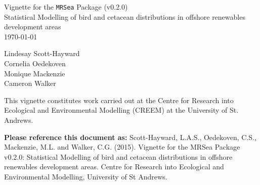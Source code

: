 \documentclass[10pt, a4paper]{article}\usepackage[]{graphicx}\usepackage[]{color}
\begin{document}
\begin{titlepage}


\begin{center}
\vspace* {0.70 in}

\noindent\makebox[\linewidth]{\rule{\paperwidth}{0.4pt}}

\huge{Vignette for the {\tt MRSea} Package (v0.2.0)}\\[0.5 cm]
\Large{Statistical Modelling of bird and cetacean distributions in offshore renewables development areas}\\
\vspace{0.3 in}
\today

\noindent\makebox[\linewidth]{\rule{\paperwidth}{0.4pt}}


\vspace{1 in}
\Large{Lindesay Scott-Hayward}\\
\Large{Cornelia Oedekoven}\\
\Large{Monique Mackenzie}\\
\Large{Cameron Walker}\\[0.5 cm]


\vspace{1.6 in}
\begin{center}
\large{This vignette constitutes work carried out at the Centre for Research into Ecological and Environmental Modelling (CREEM) at the University of St. Andrews.}
\end{center}


\thispagestyle{empty}

\end{center}

\end{titlepage}

\vspace{0.3cm}
\textbf{Please reference this document as:}
\noindent Scott-Hayward, L.A.S., Oedekoven, C.S., Mackenzie, M.L. and Walker, C.G. (2015). Vignette for the MRSea Package v0.2.0: Statistical Modelling of bird and cetacean distributions in offshore renewables development areas. Centre for Research into Ecological and Environmental Modelling, University of St Andrews.



%


\end{document}
